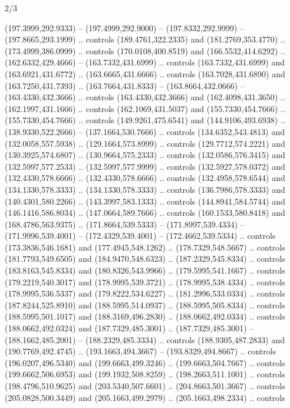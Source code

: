 \begin{flagdescription}{2/3}
\begin{scope}[xshift=0.5\flaglength,yshift=0.5\flagwidth,scale=\flagwidth/525.28]
\begin{scope}[y=0.1mm, x=0.1mm, yscale=-1,shift={(-381.5,-404)}]
\begin{scope}[shift={(5.25001,4.53053)},miter limit=4.00,line width=0.800\lw]
  (197.3999,292.9333) -- (197.4999,292.9000) -- (197.8332,292.9999) --
  (197.8665,293.1999) .. controls (189.4761,322.2335) and (181.2769,353.4770) ..
  (173.4999,386.0999) .. controls (170.0108,400.8519) and (166.5532,414.6292) ..
  (162.6332,429.4666) -- (163.7332,431.6999) .. controls (163.7332,431.6999) and
  (163.6921,431.6772) .. (163.6665,431.6666) .. controls (163.7028,431.6890) and
  (163.7250,431.7393) .. (163.7664,431.8333) -- (163.8664,432.0666) --
  (163.4330,432.3666) .. controls (163.4330,432.3666) and (162.4098,431.3650) ..
  (162.1997,431.1666) .. controls (162.1069,431.5037) and (155.7330,454.7666) ..
  (155.7330,454.7666) .. controls (149.9261,475.6541) and (144.9106,493.6938) ..
  (138.9330,522.2666) -- (137.1664,530.7666) .. controls (134.6352,543.4813) and
  (132.0058,557.5938) .. (129.1664,573.8999) .. controls (129.7712,574.2221) and
  (130.3925,574.6807) .. (130.9664,575.2333) .. controls (132.0586,576.3415) and
  (132.5997,577.2533) .. (132.5997,577.9999) .. controls (132.5927,578.0372) and
  (132.4330,578.6666) .. (132.4330,578.6666) .. controls (132.4958,578.6544) and
  (134.1330,578.3333) .. (134.1330,578.3333) .. controls (136.7986,578.3333) and
  (140.4301,580.2266) .. (143.3997,583.1333) .. controls (144.8941,584.5744) and
  (146.1416,586.8034) .. (147.0664,589.7666) .. controls (160.1533,580.8418) and
  (168.4786,563.9375) .. (171.8664,539.5333) -- (171.8997,539.4334) --
  (171.9996,539.4001) -- (172.4329,539.4001) -- (172.4662,539.5334) .. controls
  (173.3836,546.1681) and (177.4945,548.1262) .. (178.7329,548.5667) .. controls
  (181.7793,549.6505) and (184.9470,548.6323) .. (187.2329,545.8334) .. controls
  (183.8163,545.8334) and (180.8326,543.9966) .. (179.5995,541.1667) .. controls
  (179.2219,540.3017) and (178.9995,539.3721) .. (178.9995,538.4334) .. controls
  (178.9995,536.5337) and (179.8222,534.6227) .. (181.2996,533.0334) .. controls
  (187.8244,525.8910) and (188.5995,514.0937) .. (188.5995,505.8334) .. controls
  (188.5995,501.1017) and (188.3169,496.2830) .. (188.0662,492.0334) .. controls
  (188.0662,492.0324) and (187.7329,485.3001) .. (187.7329,485.3001) --
  (188.1662,485.2001) -- (188.2329,485.3334) .. controls (188.9305,487.2833) and
  (190.7769,492.4745) .. (193.1663,494.3667) -- (193.8329,494.8667) .. controls
  (196.0207,496.5340) and (199.6663,499.3246) .. (199.6663,504.7667) .. controls
  (199.6662,506.6953) and (199.1932,508.8259) .. (198.2663,511.1001) .. controls
  (198.4796,510.9625) and (203.5340,507.6601) .. (204.8663,501.3667) .. controls
  (205.0828,500.3449) and (205.1663,499.2979) .. (205.1663,498.2334) .. controls

\end{scope}
\end{scope}
\end{scope}
\end{flagdescription}
